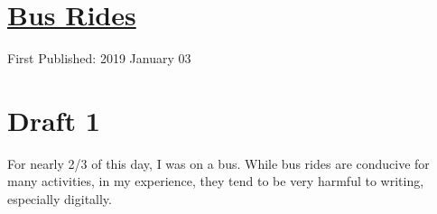\documentclass[12pt]{article}[titlepage]
\newcommand{\1}{\={a}}
\newcommand{\2}{\={e}}
\newcommand{\3}{\={\i}}
\newcommand{\4}{\=o}
\newcommand{\5}{\=u}
\newcommand{\6}{\={A}}
\renewcommand{\,}{\textsuperscript{,}}
\begin{document}
\doublespacing
\section{\href{bus-rides.html}{Bus Rides}}
First Published: 2019 January 03
\section{Draft 1}
For nearly 2/3 of this day, I was on a bus.
While bus rides are conducive for many activities, in my experience, they tend to be very harmful to writing, especially digitally.
\end{document}
